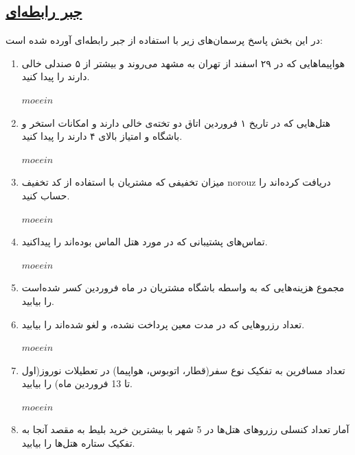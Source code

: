 \documentclass[12pt]{exam}
\begin{document}
\subsection*{\underline{جبر رابطه‌ای}}

در این بخش پاسخ پرسمان‌های زیر با استفاده از جبر رابطه‌ای آورده شده است:

\begin{enumerate}
	\item
‌هواپیماهایی که در ۲۹ اسفند از تهران به مشهد می‌روند و بیشتر از ۵ صندلی خالی دارند را پیدا کنید.

\setLTR
$moeein$
\setRTL


	\item
هتل‌هایی که در تاریخ ۱ فروردین اتاق دو تخته‌ی خالی دارند و امکانات استخر و باشگاه و \linebreak امتیاز بالای ۴ دارند را پیدا کنید.

\setLTR
$moeein$
\setRTL



	\item
	 میزان تخفیفی که مشتریان با استفاده از کد تخفیف  norouz  دریافت کرده‌اند را حساب کنید.
	 
\setLTR
$moeein$
\setRTL

	 
	 
	\item
	 تماس‌های پشتیبانی که در مورد هتل الماس بوده‌اند را پیداکنید.

\setLTR
$moeein$
\setRTL
	 
	 
	 
	 
	 
	\item
مجموع هزینه‌هایی که‌ به واسطه باشگاه مشتریان در ماه فروردین کسر شده‌است را بیابید.




	\item
تعداد رزروهایی که در مدت معین پرداخت نشده، و لغو شده‌اند را بیابید.

\setLTR
$moeein$
\setRTL





	\item
تعداد مسافرین به تفکیک نوع سفر(قطار، اتوبوس، هواپیما) در تعطیلات نوروز(اول تا 13 فروردین ماه) را بیابید.

\setLTR
$moeein$
\setRTL




	
	\item
	 آمار تعداد کنسلی رزروهای هتل‌ها در 5 شهر با بیشترین خرید بلیط به مقصد آنجا به‌ تفکیک ستاره هتل‌ها را بیابید.
	  

\end{enumerate}
\end{document}
